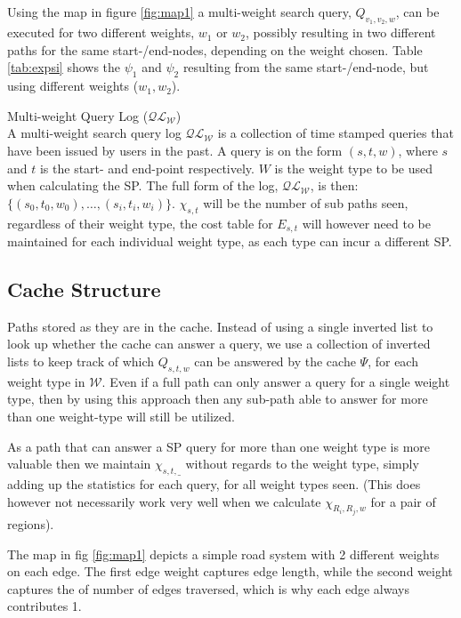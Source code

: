 Using the map in figure \ref{fig:map1} a multi-weight search query, $Q_{v_1,v_2,w}$, can be executed for two different weights, $w_1$ or $w_2$, possibly resulting in two different paths for the same start-/end-nodes, depending on the weight chosen. Table \ref{tab:expsi} shows the \spath $\psi_1$ and $\psi_2$ resulting from the same start-/end-node, but using different weights ($w_1, w_2$).


\begin{definition}{Multi-weight Query Log ($\mathcal{QL_W}$)}\\
A multi-weight search query log $\mathcal{QL_W}$ is a collection of time stamped queries that have been issued by users in the past.
A query is on the form $(s,t,w)$, where $s$ and $t$ is the start- and end-point respectively. $W$ is the weight type to be used when calculating the SP. The full form of the log, $\mathcal{QL_W}$,  is then: $\{(s_0,t_0,w_0),\dots,(s_i,t_i,w_i)\}$. $\chi_{s,t}$ will be the number of sub paths seen, regardless of their weight type, the cost table for $E_{s,t}$ will however need to be maintained for each individual weight type, as each type can incur a different SP.
\end{definition}


\subsection{Cache Structure}

Paths stored as they are in the cache. Instead of using a single inverted list to look up whether the cache can answer a query, we use a collection of inverted lists to keep track of which $Q_{s,t,w}$ can be answered by the cache $\Psi$, for each weight type in $\mathcal{W}$.
Even if a full path can only answer a query for a single weight type, then by using this approach then any sub-path able to answer for more than one weight-type will still be utilized. 

As a path that can answer a SP query for more than one weight type is more valuable then we maintain $\chi_{s,t,\_}$ without regards to the weight type, simply adding up the statistics for each query, for all weight types seen. (This does however not necessarily work very well when we calculate $\chi_{R_i,R_j,w}$ for a pair of regions). 

The map in  fig \ref{fig:map1} depicts a simple road system with 2 different weights on each edge. The first edge weight captures edge length, while the second weight captures the of number of edges traversed, which is why each edge always contributes 1.

